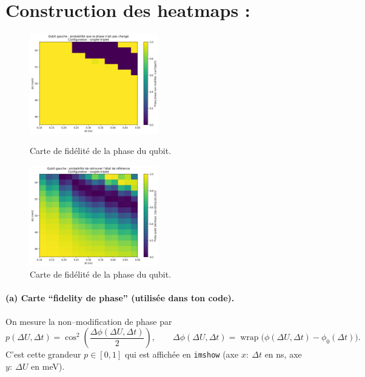 \documentclass{article}
\begin{document}
\section*{Construction des heatmaps :}
\begin{figure}[H]
  \centering
  \begin{minipage}[c]{0.6\textwidth}
    \centering
    \includegraphics[width=0.5\textwidth]{qubit_results/singlet-triplet__p_si0_15_15/images/15x15__singlet-triplet__qubit/p_nochange_map_qubit_left_singlet-triplet_15x15_20250821-041033.png}
    \caption{Carte de fidélité de la phase du qubit.}
    \label{fig:fidelity_map_1}
  \end{minipage}\hfill
  \begin{minipage}[c]{0.6\textwidth}
    \centering
    \includegraphics[width=0.5\textwidth]{qubit_results/singlet-triplet__p_si0_15_15/images/15x15__singlet-triplet__qubit/p_qubit_overlap_map_left_15x15_20250821-032340.png}
    \caption{Carte de fidélité de la phase du qubit.}
    \label{fig:fidelity_map_detector}
  \end{minipage}
\end{figure}
\paragraph{(a) Carte “fidelity de phase” (utilisée dans ton code).}
On mesure la non–modification de phase par
\[
p(\Delta U,\Delta t)=\cos^2\!\left(\frac{\Delta\phi(\Delta U,\Delta t)}{2}\right),
\qquad
\Delta\phi(\Delta U,\Delta t)=\operatorname{wrap}\!\big(\phi(\Delta U,\Delta t)-\phi_0(\Delta t)\big).
\]
C’est cette grandeur $p\in[0,1]$ qui est affichée en \texttt{imshow} (axe $x:\ \Delta t$ en ns, axe $y:\ \Delta U$ en meV).
\end{document}
